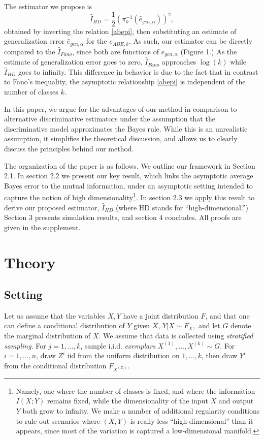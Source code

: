 \documentclass{article}
\begin{document}
The estimator we propose is
\[
\hat{I}_{HD} = \frac{1}{2}(\pi_{k}^{-1}(\hat{e}_{gen, \alpha}))^2,
\]
obtained by inverting the relation \eqref{abepi}, then substituting
an estimate of generalization error $\hat{e}_{gen, \alpha}$ for the $e_{ABE, k}$.  As such,
our estimator can be directly compared to the $\hat{I}_{Fano}$, since
both are functions of $\hat{e}_{gen,\alpha}$ (Figure 1.)
As the estimate of generalization error goes to zero, $\hat{I}_{Fano}$ approaches $\log(k)$
while $\hat{I}_{HD}$ goes to infinity.   This difference in behavior is due to the fact that
in contrast to Fano's inequality, the asymptotic relationship \eqref{abepi} is independent of the
number of classes $k$.

In this paper, we argue for the advantages of our method in comparison to alternative discriminative estimators
under the assumption that the discriminative model approximates the Bayes rule.
While this is an unrealistic assumption, it simplifies the theoretical discussion, and allows us to clearly
discuss the principles behind our method.  

The organization of the paper is as follows.
We outline our framework in Section 2.1.
In section 2.2 we present our key result, which links the asymptotic average Bayes error
to the mutual information, under an asymptotic setting intended to capture the
notion of high dimensionality\footnote{Namely, one where the number of classes
is fixed, and where the information $I(X; Y)$ remains fixed, while the
dimensionality of the input $X$ and output $Y$ both grow to infinity.
We make a number of additional regularity conditions to rule out
scenarios where $(X, Y)$ is really less ``high-dimensional'' than it
appears, since most of the variation is captured a low-dimensional
manifold.  }. In section 2.3 we apply this result to
derive our proposed estimator, $\hat{I}_{HD}$ (where HD stands for
``high-dimensional.'')  Section 3 presents simulation results, and
section 4 concludes.  All proofs are given in the supplement.


\section{Theory}

\subsection{Setting}

Let us assume that the variables $X, Y$ have a joint distribution $F$,
and that one can define a conditional distribution of $Y$ given $X$,
$Y|X \sim F_X,$ and let $G$ denote the marginal distribution of $X$.
We assume that data is collected using \emph{stratified sampling}.
For $j = 1,\hdots, k$, sample
  i.i.d. \emph{exemplars} $X^{(1)},\hdots, X^{(k)} \sim G$.  For $i =
  1,\hdots, n$, draw $Z^i$ iid from the uniform distribution on
  $1,\hdots, k$, then draw $Y^i$ from the conditional distribution
  $F_{X^{(Z_i)}}$.
\end{document}
